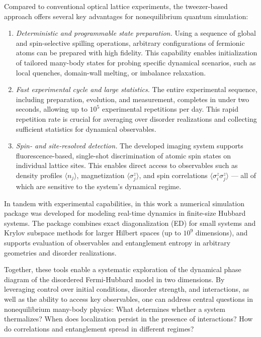 Compared to conventional optical lattice experiments, the tweezer-based approach offers several key advantages for nonequilibrium quantum simulation:
\begin{enumerate}
	\item \textit{Deterministic and programmable state preparation.} Using a sequence of global and spin-selective spilling operations, arbitrary configurations of fermionic atoms can be prepared with high fidelity. This capability enables initialization of tailored many-body states for probing specific dynamical scenarios, such as local quenches, domain-wall melting, or imbalance relaxation.
	\item \textit{Fast experimental cycle and large statistics.} The entire experimental sequence, including preparation, evolution, and measurement, completes in under two seconds, allowing up to $10^5$ experimental repetitions per day. This rapid repetition rate is crucial for averaging over disorder realizations and collecting sufficient statistics for dynamical observables.
	\item \textit{Spin- and site-resolved detection.} The developed imaging system supports fluorescence-based, single-shot discrimination of atomic spin states on individual lattice sites. This enables direct access to observables such as density profiles $\langle n_j \rangle$, magnetization $\langle \sigma^z_j \rangle$, and spin correlations $\langle \sigma^z_i \sigma^z_j \rangle$ — all of which are sensitive to the system's dynamical regime.
\end{enumerate}

In tandem with experimental capabilities, in this work a numerical simulation package was developed for modeling real-time dynamics in finite-size Hubbard systems. The package combines exact diagonalization (ED) for small systems and Krylov subspace methods for larger Hilbert spaces (up to $10^9$ dimensions), and supports evaluation of observables and entanglement entropy in arbitrary geometries and disorder realizations.

Together, these tools enable a systematic exploration of the dynamical phase diagram of the disordered Fermi-Hubbard model in two dimensions. By leveraging control over initial conditions, disorder strength, and interactions, as well as the ability to access key observables, one can address central questions in nonequilibrium many-body physics: What determines whether a system thermalizes? When does localization persist in the presence of interactions? How do correlations and entanglement spread in different regimes?

